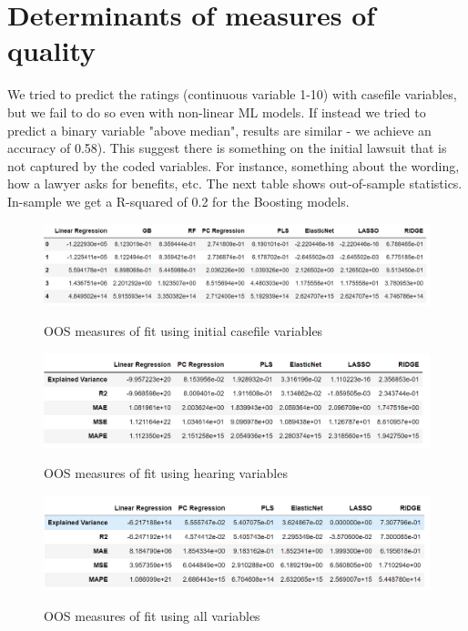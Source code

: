 \documentclass[oneside,11pt]{article}
\begin{document}
\section{Determinants of measures of quality}

We tried to predict the ratings (continuous variable 1-10)  with casefile variables, but we fail to do so even with non-linear ML models. If instead we tried to predict a binary variable "above median", results are similar - we achieve an accuracy of 0.58). This suggest there is something on the initial lawsuit that is not captured by the coded variables. For instance, something about the wording, how a lawyer asks for benefits, etc. The next table shows out-of-sample statistics. In-sample we get a R-squared of 0.2 for the Boosting models.



\begin{figure}[H]%
 \centering
 \caption{OOS measures of fit using initial casefile variables}
 \includegraphics[width=\textwidth]{Figuras/oos_X_HD.png}
 \label{fig:3}
\end{figure}

\begin{figure}[H]%
 \centering
 \caption{OOS measures of fit using hearing variables}
 \includegraphics[width=\textwidth]{Figuras/oos_Z_HD.png}
 \label{fig:3}
\end{figure}


\begin{figure}[H]%
 \centering
 \caption{OOS measures of fit using all variables}
 \includegraphics[width=\textwidth]{Figuras/oos_W_HD.png}
 \label{fig:3}
\end{figure}
\end{document}
